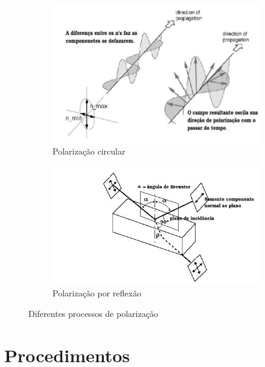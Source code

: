 \documentclass[a4paper,11pt]{article}
\begin{document}
\begin{figure}[!htp]
	\begin{subfigure}[!htp]{0.3\textwidth}
		\includegraphics[scale= 0.3]{./images/circ-polarizared.jpg}
		\caption{Polarização circular}
		\label{fig:pol-circular}
	\end{subfigure}  
	\hspace{2 cm}
	\begin{subfigure}[!htp]{0.3\textwidth}
		\includegraphics[scale= 0.4]{./images/polarization-by-reflex.jpg}
		\caption{Polarização por reflexão}
		\label{fig:brewster}
	\end{subfigure}  
	\caption{Diferentes processos de polarização}
\end{figure}
\FloatBarrier

\newpage


\section{Procedimentos}
\end{document}
